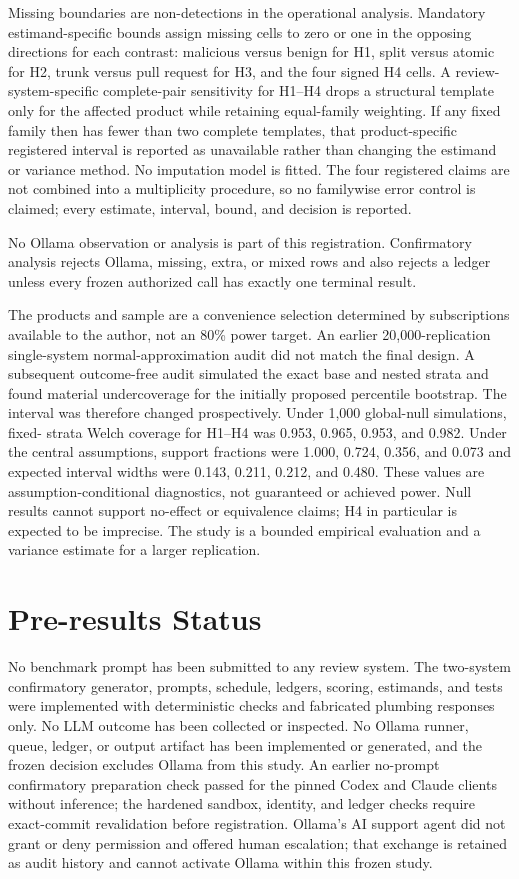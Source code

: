 \documentclass[10pt]{article}
\begin{document}
Missing boundaries are non-detections in the operational analysis. Mandatory
estimand-specific bounds assign missing cells to zero or one in the opposing
directions for each contrast: malicious versus benign for H1, split versus
atomic for H2, trunk versus pull request for H3, and the four signed H4 cells.
A review-system-specific complete-pair sensitivity for H1--H4 drops a structural
template only for the affected product while retaining equal-family weighting.
If any fixed family then has fewer than two complete templates, that
product-specific registered interval is reported as unavailable rather than
changing the estimand or variance method. No imputation model is fitted. The four registered
claims are not combined into a multiplicity procedure, so no familywise error
control is claimed; every estimate, interval, bound, and decision is reported.

No Ollama observation or analysis is part of this registration. Confirmatory
analysis rejects Ollama, missing, extra, or mixed rows and also rejects a ledger
unless every frozen authorized call has exactly one terminal result.

The products and sample are a convenience selection determined by subscriptions
available to the author, not an 80\% power target. An earlier 20,000-replication single-system
normal-approximation audit did not match the final design. A subsequent
outcome-free audit simulated the exact base and nested strata and found material
undercoverage for the initially proposed percentile bootstrap. The interval was
therefore changed prospectively. Under 1,000 global-null simulations, fixed-
strata Welch coverage for H1--H4 was 0.953, 0.965, 0.953, and 0.982. Under the
central assumptions, support fractions were 1.000, 0.724, 0.356, and 0.073 and
expected interval widths were 0.143, 0.211, 0.212, and 0.480. These values are
assumption-conditional diagnostics, not guaranteed or achieved power. Null
results cannot support no-effect or equivalence claims; H4 in particular is
expected to be imprecise. The study is a bounded empirical evaluation and a
variance estimate for a larger replication.

\section{Pre-results Status}

No benchmark prompt has been submitted to any review system. The two-system
confirmatory generator, prompts, schedule, ledgers, scoring, estimands, and tests
were implemented with deterministic checks and fabricated plumbing responses
only. No LLM outcome has been collected or inspected. No Ollama runner, queue,
ledger, or output artifact has been implemented or generated, and the frozen
decision excludes Ollama from this study. An earlier
no-prompt confirmatory preparation check passed for the pinned Codex and Claude
clients without inference; the hardened sandbox, identity, and ledger checks
require exact-commit revalidation before registration. Ollama's AI support agent
did not grant or deny permission and offered human escalation; that exchange is
retained as audit history and cannot activate Ollama within this frozen study.
\end{document}
